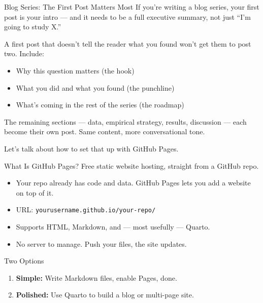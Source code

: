 \begin{frame}{Blog Series: The First Post Matters Most}
  If you're writing a blog series, your first post is your intro --- and it needs to be a full executive summary, not just ``I'm going to study X.''

  \vspace{6pt}

  A first post that doesn't tell the reader what you found won't get them to post two. Include:
  \begin{itemize}
    \item Why this question matters (the hook)
    \item What you did and what you found (the punchline)
    \item What's coming in the rest of the series (the roadmap)
  \end{itemize}

  \vspace{6pt}

  The remaining sections --- data, empirical strategy, results, discussion --- each become their own post. Same content, more conversational tone.

  \vspace{6pt}

  Let's talk about how to set that up with GitHub Pages.
\end{frame}

\begin{frame}{What Is GitHub Pages?}
  Free static website hosting, straight from a GitHub repo.

  \vspace{6pt}

  \begin{itemize}
    \item Your repo already has code and data. GitHub Pages lets you add a website on top of it.
    \item URL: \texttt{yourusername.github.io/your-repo/}
    \item Supports HTML, Markdown, and --- most usefully --- Quarto.
    \item No server to manage. Push your files, the site updates.
  \end{itemize}

  \vspace{8pt}

  \begin{block}{Two Options}
    \begin{enumerate}
      \item \textbf{Simple:} Write Markdown files, enable Pages, done.
      \item \textbf{Polished:} Use Quarto to build a blog or multi-page site.
    \end{enumerate}
  \end{block}
\end{frame}


